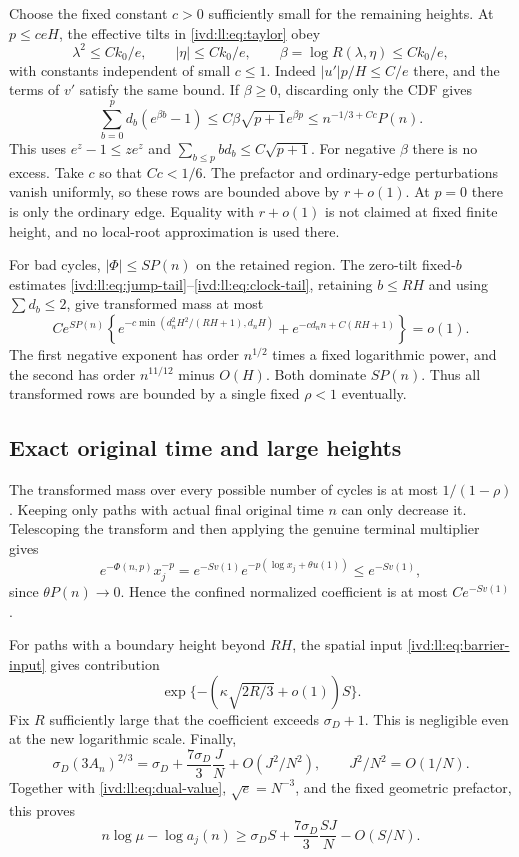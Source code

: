 \documentclass[11pt,letterpaper]{article}
\theoremstyle{remark}\newtheorem{remark}[theorem]{Remark}
\numberwithin{equation}{section}
\begin{document}
Choose the fixed constant $c>0$ sufficiently small for the remaining
heights. At $p\le ceH$, the effective tilts in \eqref{ivd:ll:eq:taylor}
obey
\[
 \lambda^2\le Ck_0/e,\qquad |\eta|\le Ck_0/e,\qquad
 \beta=\log R(\lambda,\eta)\le Ck_0/e,
\]
with constants independent of small $c\le1$. Indeed
$|u'|p/H\le C/e$ there, and the terms of $v'$ satisfy the
same bound. If $\beta\ge0$, discarding only the CDF gives
\begin{equation}\label{ivd:ll:eq:low-excess}
 \sum_{b=0}^{p}d_b(e^{\beta b}-1)
 \le C\beta\sqrt{p+1}e^{\beta p}
 \le n^{-1/3+Cc}P(n).
\end{equation}
This uses $e^z-1\le ze^z$ and
$\sum_{b\le p}bd_b\le C\sqrt{p+1}$. For negative $\beta$
there is no excess. Take $c$ so that $Cc<1/6$.
The prefactor and ordinary-edge perturbations vanish uniformly,
so these rows are bounded above by $r+o(1)$. At $p=0$ there is
only the ordinary edge. Equality with $r+o(1)$ is not claimed at
fixed finite height, and no local-root approximation is used there.

For bad cycles, $|\Phi|\le SP(n)$ on the retained region.
The zero-tilt fixed-$b$ estimates
\eqref{ivd:ll:eq:jump-tail}--\eqref{ivd:ll:eq:clock-tail}, retaining $b\le RH$
and using $\sum d_b\le2$, give transformed mass at most
\begin{equation}\label{ivd:ll:eq:bad}
 Ce^{SP(n)}\left\{
 e^{-c\min(d_n^2H^2/(RH+1),d_nH)}
 +e^{-cd_nn+C(RH+1)}\right\}=o(1).
\end{equation}
The first negative exponent has order $n^{1/2}$ times a fixed
logarithmic power, and the second has order $n^{11/12}$ minus
$O(H)$. Both dominate $SP(n)$. Thus all transformed rows are
bounded by a single fixed $\rho<1$ eventually.

\subsection{Exact original time and large heights}
The transformed mass over every possible number of cycles is at
most $1/(1-\rho)$. Keeping only paths with actual final original
time $n$ can only decrease it. Telescoping the transform and then
applying the genuine terminal multiplier gives
\[
 e^{-\Phi(n,p)}x_j^{-p}
 =e^{-Sv(1)}e^{-p(\log x_j+\theta u(1))}\le e^{-Sv(1)},
\]
since $\theta P(n)\to0$. Hence the confined normalized
coefficient is at most $Ce^{-Sv(1)}$.

For paths with a boundary height beyond $RH$, the spatial input
\eqref{ivd:ll:eq:barrier-input} gives contribution
\[
 \exp\{-(\kappa\sqrt{2R/3}+o(1))S\}.
\]
Fix $R$ sufficiently large that the coefficient exceeds
$\sigma_D+1$. This is negligible even at the new logarithmic
scale. Finally,
\[
 \sigma_D(3A_n)^{2/3}
 =\sigma_D+\frac{7\sigma_D}{3}\frac JN+O(J^2/N^2),
 \qquad J^2/N^2=O(1/N).
\]
Together with \eqref{ivd:ll:eq:dual-value}, $\sqrt e=N^{-3}$, and the
fixed geometric prefactor, this proves
\begin{equation}\label{ivd:ll:eq:upper-coeff}
 n\log\mu-\log a_j(n)
 \ge\sigma_D S+\frac{7\sigma_D}{3}\frac{SJ}{N}-O(S/N).
\end{equation}
\end{document}
